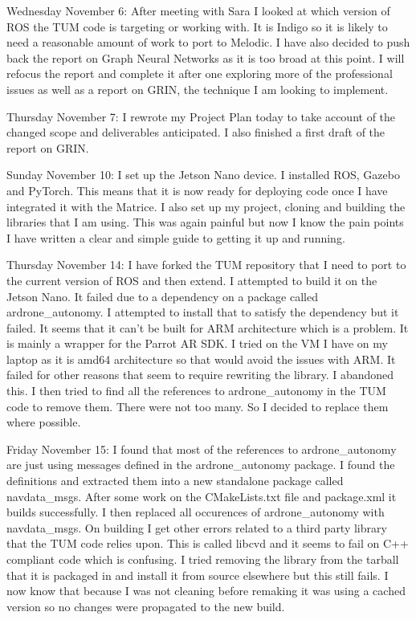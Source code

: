 \documentclass[]{../resources/final_report}
\begin{document}
\begin{appendices}
  Wednesday November 6: After meeting with Sara I looked at which version of ROS the TUM code is targeting or working with. It is Indigo so it is likely to need a reasonable amount of work to port to Melodic. I have also decided to push back the report on Graph Neural Networks as it is too broad at this point. I will refocus the report and complete it after one exploring more of the professional issues as well as a report on GRIN, the technique I am looking to implement.
  
  Thursday November 7: I rewrote my Project Plan today to take account of the changed scope and deliverables anticipated. I also finished a first draft of the report on GRIN.
  
  Sunday November 10: I set up the Jetson Nano device. I installed ROS, Gazebo and PyTorch. This means that it is now ready for deploying code once I have integrated it with the Matrice. I also set up my project, cloning and building the libraries that I am using. This was again painful but now I know the pain points I have written a clear and simple guide to getting it up and running.
  
  Thursday November 14: I have forked the TUM repository that I need to port to the current version of ROS and then extend. I attempted to build it on the Jetson Nano. It failed due to a dependency on a package called ardrone\_autonomy. I attempted to install that to satisfy the dependency but it failed. It seems that it can’t be built for ARM architecture which is a problem. It is mainly a wrapper for the Parrot AR SDK. I tried on the VM I have on my laptop as it is amd64 architecture so that would avoid the issues with ARM. It failed for other reasons that seem to require rewriting the library. I abandoned this. I then tried to find all the references to ardrone\_autonomy in the TUM code to remove them. There were not too many. So I decided to replace them where possible.
  
  Friday November 15: I found that most of the references to ardrone\_autonomy are just using messages defined in the ardrone\_autonomy package. I found the definitions and extracted them into a new standalone package called navdata\_msgs. After some work on the CMakeLists.txt file and package.xml it builds successfully. I then replaced all occurences of ardrone\_autonomy with navdata\_msgs. On building I get other errors related to a third party library that the TUM code relies upon. This is called libcvd and it seems to fail on C++ compliant code which is confusing. I tried removing the library from the tarball that it is packaged in and install it from source elsewhere but this still fails. I now know that because I was not cleaning before remaking it was using a cached version so no changes were propagated to the new build.
  

\end{appendices}
\end{document}
